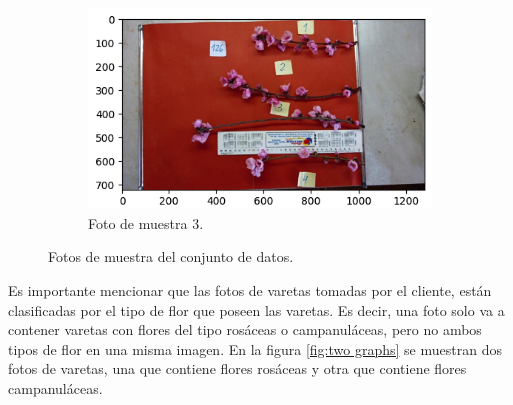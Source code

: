 \begin{figure}[ht]
\begin{subfigure}[b]{0.4\textwidth}
     \end{subfigure}
     \hfill
     \begin{subfigure}[b]{0.5\textwidth}
         \centering
         \includegraphics[scale=.45]{./Figures/flor_muestra6.png}
         \caption{Foto de muestra 3.}
         \label{fig:3de3}
     \end{subfigure}
        \caption{Fotos de muestra del conjunto de datos.}
        \label{fig:three graphs}
\end{figure}

Es importante mencionar que las fotos de varetas tomadas por el cliente, están clasificadas por el tipo de flor que poseen las varetas. Es decir, una foto solo va a contener varetas con flores del tipo rosáceas o campanuláceas, pero no ambos tipos de flor en una misma imagen. En la figura \ref{fig:two graphs} se muestran dos fotos de varetas, una que contiene flores rosáceas y otra que contiene flores campanuláceas.

